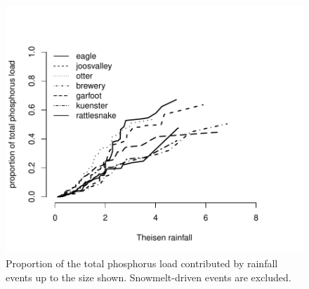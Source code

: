 \documentclass[12pt]{article}
\begin{document}
\begin{figure}
    \begin{center}
\includegraphics{loadings-figure3}
    \end{center}
    \caption{Proportion of the total phosphorus load contributed by rainfall events up to the size shown. Snowmelt-driven events are excluded.\label{cdf-s}}
\end{figure}
\end{document}
